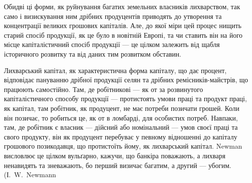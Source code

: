Обидві ці форми, як руйнування багатих земельних власників лихварством,
так само і визискування ним дрібних продуцентів приводять до утворення та
концентрації великих грошових капіталів. Але, до якої міри цей процес нищить
старий спосіб продукції, як це було в новітній Европі, та чи ставить він на
його місце капіталістичний спосіб продукції — це цілком залежить від щабля
історичного розвитку та від даних тим розвитком обставин.

Лихварський капітал, як характеристична форма капіталу, що дає процент,
відповідає пануванню дрібної продукції селян та дрібних ремісників-майстрів,
що працюють самостійно. Там, де робітникові — як от за розвинутого капіталістичного
способу продукції — протистоять умови праці та продукт праці, як капітал,
там робітник, як продуцент, не має потреби позичати грошей. Коли він позичає, то
робиться це, як от в ломбарді, для особистих потреб. Навпаки, там, де робітник
є власник — дійсний або номінальний — умов своєї праці та свого продукту, він
як продуцент перебуває у певному відношенні до капіталу грошового позикодавця,
що протистоїть йому, як лихварський капітал. Newman висловлює це
цілком вульґарно, кажучи, що банкіра поважають, а лихваря ненавидять та зневажають,
бо перший визичає багатим, а другий — убогим. (І.~W.~Newmann
\parbreak{}  %

